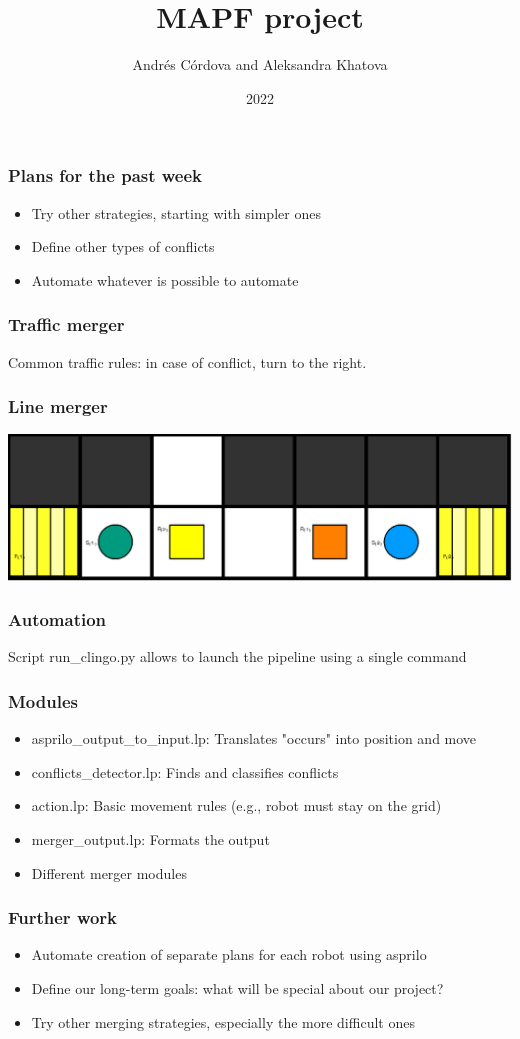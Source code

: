 \documentclass{beamer}
\title{MAPF project}
\author{Andrés Córdova and Aleksandra Khatova}
\institute{Unversity of Potsdam}
\date{2022}
\begin{document}
\frame{\titlepage}

\begin{frame}
\frametitle{Plans for the past week}
\begin{itemize} 
\item<1-> Try other strategies, starting with simpler ones
\item<2-> Define other types of conflicts
\item<3-> Automate whatever is possible to automate
\end{itemize} 
\end{frame}

\begin{frame}
\frametitle{Traffic merger}
Common traffic rules: in case of conflict, turn to the right.
\end{frame}


\begin{frame}
\frametitle{Line merger}
\centering
\includegraphics[scale=0.2]{x5y2r2s2p2.png}
\end{frame}

\begin{frame}
\frametitle{Automation}
Script run\_clingo.py allows to launch the pipeline using a single command
\end{frame}

\begin{frame}
\frametitle{Modules}
\begin{itemize}
\item<1->asprilo\_output\_to\_input.lp: Translates "occurs" into position and move
\item<2->conflicts\_detector.lp: Finds and classifies conflicts
\item<3->action.lp: Basic movement rules (e.g., robot must stay on the grid)
\item<4->merger\_output.lp: Formats the output
\item<4->Different merger modules
\end{itemize}
\end{frame}


\begin{frame}
\frametitle{Further work}
\begin{itemize} 
\item<1-> Automate creation of separate plans for each robot using asprilo
\item<2-> Define our long-term goals: what will be special about our project?
\item<3-> Try other merging strategies, especially the more difficult ones
\end{itemize} 
\end{frame}
\end{document}
